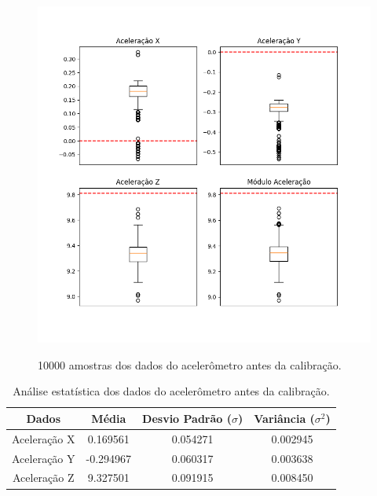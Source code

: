 \documentclass[acronym, symbols, table]{fei}
\begin{document}
					\begin{figure}[!htb]
						\centering
						\caption{10000 amostras dos dados do acelerômetro antes da calibração.}
						\includegraphics[width=1.0\textwidth]{dados_acelerometro_errados.png}
						\label{fig:dados_acelerometro_errado}
					\end{figure}
					
					\begin{table}[!htb]
						\centering
						\caption{Análise estatística dos dados do acelerômetro antes da calibração.}\label{tab:acelerometro_antes_calibracao}
						\begin{tabular}{|c|c|c|c|}
							\hline
							Dados & Média & Desvio Padrão ($\sigma$) & Variância ($\sigma^2$) \\ \hline
							\small Aceleração X & 0.169561  & 0.054271 & 0.002945 \\ \hline
							\small Aceleração Y & -0.294967 & 0.060317 & 0.003638 \\ \hline
							\small Aceleração Z & 9.327501  & 0.091915 & 0.008450 \\ \hline			
						\end{tabular}
					\end{table}
					
\end{document}
